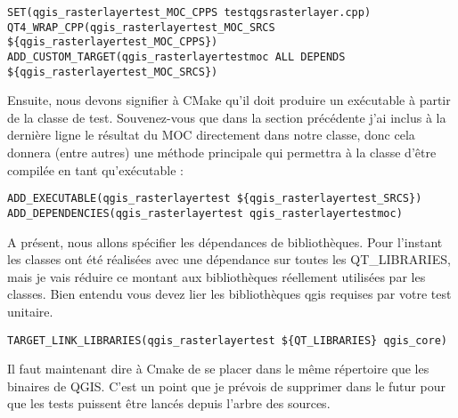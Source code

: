 \begin{verbatim}
SET(qgis_rasterlayertest_MOC_CPPS testqgsrasterlayer.cpp)
QT4_WRAP_CPP(qgis_rasterlayertest_MOC_SRCS ${qgis_rasterlayertest_MOC_CPPS})
ADD_CUSTOM_TARGET(qgis_rasterlayertestmoc ALL DEPENDS ${qgis_rasterlayertest_MOC_SRCS})
\end{verbatim}

Ensuite, nous devons signifier à CMake qu'il doit produire un exécutable à partir de la classe de test. Souvenez-vous que dans la section précédente j'ai inclus à la dernière ligne le résultat du MOC directement dans notre classe, donc cela donnera (entre autres) une méthode principale qui permettra à la classe d'être compilée en tant qu'exécutable :

\begin{verbatim}
ADD_EXECUTABLE(qgis_rasterlayertest ${qgis_rasterlayertest_SRCS})
ADD_DEPENDENCIES(qgis_rasterlayertest qgis_rasterlayertestmoc)
\end{verbatim}

A présent, nous allons spécifier les dépendances de bibliothèques. Pour l'instant les classes ont été réalisées avec une dépendance sur toutes les QT\_LIBRARIES, mais je vais réduire ce montant aux bibliothèques réellement utilisées par les classes. Bien entendu vous devez lier les bibliothèques qgis requises par votre test unitaire.

\begin{verbatim}
TARGET_LINK_LIBRARIES(qgis_rasterlayertest ${QT_LIBRARIES} qgis_core)
\end{verbatim}

Il faut maintenant dire à Cmake de se placer dans le même répertoire que les binaires de QGIS. C'est un point que je prévois de supprimer dans le futur pour que les tests puissent être lancés depuis l'arbre des sources.

